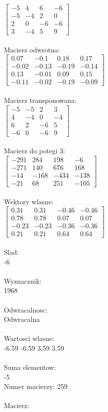 \documentclass[a4paper,12pt]{article}
\begin{document}
$\begin{bmatrix} -5&4&6&-6\\-5&-4&2&0\\2&0&-6&-6\\3&-4&5&9 \end{bmatrix}$
\\
\\
Macierz odwrotna:\\

$\begin{bmatrix} 0.07&-0.1&0.18&0.17\\-0.02&-0.13&-0.19&-0.14\\0.13&-0.01&0.09&0.15\\-0.11&-0.02&-0.19&-0.09 \end{bmatrix}$
\\
\\
Macierz transponowana:\\

$\begin{bmatrix} -5&-5&2&3\\4&-4&0&-4\\6&2&-6&5\\-6&0&-6&9 \end{bmatrix}$
\\
\\
Macierz do potegi 3:\\

$\begin{bmatrix} -291&284&198&-6\\-271&140&676&168\\-14&-168&-434&-138\\-21&68&251&-105 \end{bmatrix}$
\\
\\
Wektory wlasne:\\

$\begin{bmatrix} 0.31&0.31&-0.46&-0.46\\0.78&0.78&0.07&0.07\\-0.23&-0.23&-0.36&-0.36\\0.21&0.21&0.64&0.64 \end{bmatrix}$
\\
\\
Slad:\\
-6
\\
\\
Wyznacznik:\\
1968
\\
\\
Odwracalnosc:\\
Odwracalna
\\
\\
Wartosci wlasne:\\
-6.59 -6.59 3.59 3.59
\\
\\
Suma elementow:\\
-5
\\
\newpage
Numer macierzy:
259
\\
\\
Macierz:\\
\end{document}
